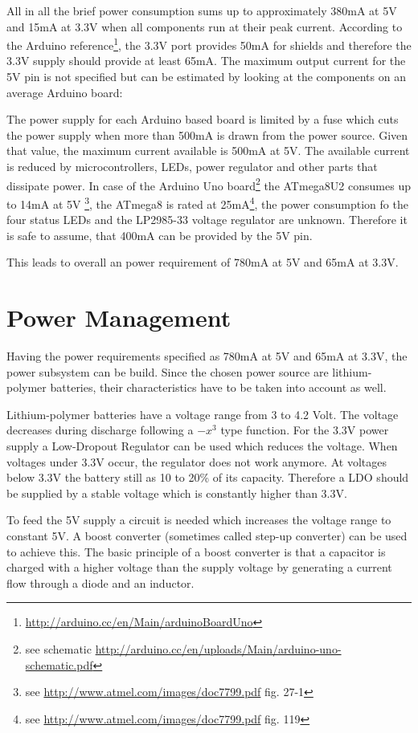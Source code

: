 All in all the brief power consumption sums up to approximately 380mA at 5V and 15mA at 3.3V when all components run at their peak current. According to the Arduino reference\footnote{\url{http://arduino.cc/en/Main/arduinoBoardUno}}, the 3.3V port provides 50mA for shields and therefore the 3.3V supply should provide at least 65mA. The maximum output current for the 5V pin is not specified but can be estimated by looking at the components on an average Arduino board:

The power supply for each Arduino based board is limited by a fuse which cuts the power supply when more than 500mA is drawn from the power source. Given that value, the maximum current available is 500mA at 5V. The available current is reduced by microcontrollers, LEDs, power regulator and other parts that dissipate power. In case of the Arduino Uno board\footnote{see schematic \url{http://arduino.cc/en/uploads/Main/arduino-uno-schematic.pdf}} the ATmega8U2 consumes up to 14mA at 5V \footnote{see \url{http://www.atmel.com/images/doc7799.pdf} fig. 27-1}, the ATmega8 is rated at 25mA\footnote{see \url{http://www.atmel.com/images/doc7799.pdf} fig. 119}, the power consumption fo the four status LEDs and the LP2985-33 voltage regulator are unknown. Therefore it is safe to assume, that 400mA can be provided by the 5V pin.

This leads to overall an power requirement of 780mA at 5V and 65mA at 3.3V.

\section{Power Management}
Having the power requirements specified as 780mA at 5V and 65mA at 3.3V, the power subsystem can be build.  Since the chosen power source are lithium-polymer batteries, their characteristics have to be taken into account as well.

Lithium-polymer batteries have a voltage range from 3 to 4.2 Volt. The voltage decreases during discharge following a $-x^3$ type function. For the 3.3V power supply a Low-Dropout Regulator can be used which reduces the voltage. When voltages under 3.3V occur, the regulator does not work anymore. At voltages below 3.3V the battery still as 10 to 20\% of its capacity. Therefore a LDO should be supplied by a stable voltage which is constantly higher than 3.3V.

To feed the 5V supply a circuit is needed which increases the voltage range to constant 5V. A boost converter (sometimes called step-up converter) can be used to achieve this. The basic principle of a boost converter is that a capacitor is charged with a higher voltage than the supply voltage by generating a current flow through a diode and an inductor. 

